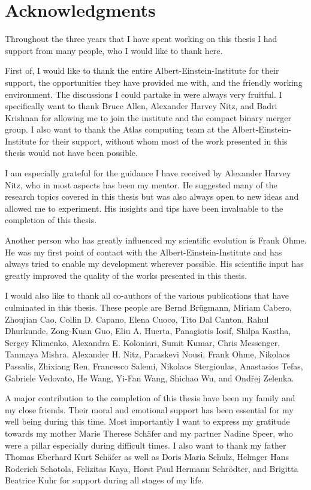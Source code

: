 \chapter{Acknowledgments}
Throughout the three years that I have spent working on this thesis I had support from many people, who I would like to thank here.

First of, I would like to thank the entire Albert-Einstein-Institute for their support, the opportunities they have provided me with, and the friendly working environment. The discussions I could partake in were always very fruitful. I specifically want to thank Bruce Allen, Alexander Harvey Nitz, and Badri Krishnan for allowing me to join the institute and the compact binary merger group. I also want to thank the Atlas computing team at the Albert-Einstein-Institute for their support, without whom most of the work presented in this thesis would not have been possible.

I am especially grateful for the guidance I have received by Alexander Harvey Nitz, who in most aspects has been my mentor. He suggested many of the research topics covered in this thesis but was also always open to new ideas and allowed me to experiment. His insights and tips have been invaluable to the completion of this thesis.

Another person who has greatly influenced my scientific evolution is Frank Ohme. He was my first point of contact with the Albert-Einstein-Institute and has always tried to enable my development wherever possible. His scientific input has greatly improved the quality of the works presented in this thesis.

I would also like to thank all co-authors of the various publications that have culminated in this thesis. These people are Bernd Br{\"u}gmann, Miriam Cabero, Zhoujian Cao, Collin D. Capano, Elena Cuoco, Tito Dal Canton, Rahul Dhurkunde, Zong-Kuan Guo, Eliu A. Huerta, Panagiotis Iosif, Shilpa Kastha, Sergey Klimenko, Alexandra E. Koloniari, Sumit Kumar, Chris Messenger, Tanmaya Mishra, Alexander H. Nitz, Paraskevi Nousi, Frank Ohme, Nikolaos Passalis, Zhixiang Ren, Francesco Salemi, Nikolaos Stergioulas, Anastasios Tefas, Gabriele Vedovato, He Wang, Yi-Fan Wang, Shichao Wu, and Ond{\v{r}}ej Zelenka.

A major contribution to the completion of this thesis have been my family and my close friends. Their moral and emotional support has been essential for my well being during this time. Most importantly I want to express my gratitude towards my mother Marie Therese Schäfer and my partner Nadine Speer, who were a pillar especially during difficult times. I also want to thank my father Thomas Eberhard Kurt Schäfer as well as Doris Maria Schulz, Helmger Hans Roderich Schotola, Felizitas Kaya, Horst Paul Hermann Schrödter, and Brigitta Beatrice Kuhr for support during all stages of my life.

